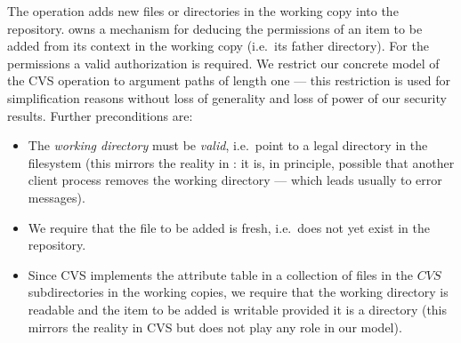 The  operation adds new files or directories in the working copy
into the repository.  owns a mechanism for deducing the permissions
of an item to be added from its context in the working copy (i.e.\  its father
directory). For the permissions a valid authorization is required. We restrict
our concrete model of the CVS  operation to argument paths of length
one --- this restriction is used for simplification reasons without loss of 
generality and loss of power of our security results.  Further preconditions are:
\begin{itemize}
\item The \emph{working directory} must be \emph{valid}, i.e.\ point to a legal
  directory in the filesystem (this mirrors the reality in \unix: it is, in
  principle, possible that another client process removes the working directory
  --- which leads usually to error messages).
\item We require that the file to be added is fresh, i.e.\ does not yet exist in
  the repository.
\item Since CVS implements the attribute table in a collection of files in the
  $CVS$ subdirectories in the working copies, we require that the working
  directory is readable and the item to be added is writable provided it is a
  directory (this mirrors the reality in CVS but does not play any role in our
  model).
\end{itemize}

